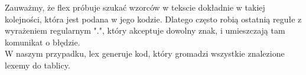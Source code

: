 	\spacing
	
	Zauważmy, że flex próbuje szukać wzorców w tekscie dokładnie w takiej kolejności, która jest podana w
	jego kodzie. Dlatego często robią ostatnią regułe z wyrażeniem regularnym ".", który akceptuje
	dowolny znak, i umieszczają tam komunikat o błędzie.
	\\

	W naszym przypadku, lex generuje kod, który gromadzi wszystkie znalezione lexemy do tablicy.

	\newpage
